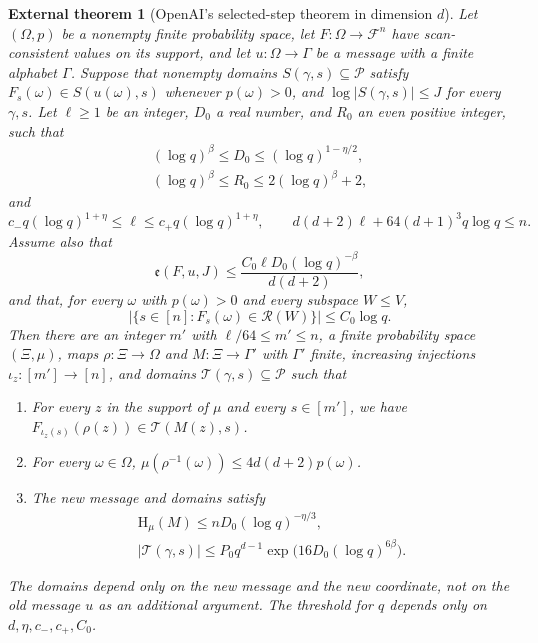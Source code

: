 \documentclass[11pt,a4paper]{article}
\numberwithin{equation}{section}
\newtheorem{external}[theorem]{External theorem}
\newcommand{\HH}{\mathrm H}
\begin{document}
\begin{external}[OpenAI's selected-step theorem in dimension $d$]
Let $(\Omega,p)$ be a nonempty finite probability space,
let $F:\Omega\to\mathcal F^n$ have scan-consistent values on
its support, and let $u:\Omega\to\Gamma$ be a message with a
finite alphabet $\Gamma$. Suppose that nonempty domains
$S(\gamma,s)\subseteq\mathcal P$ satisfy
$F_s(\omega)\in S(u(\omega),s)$ whenever $p(\omega)>0$,
and $\log|S(\gamma,s)|\le J$ for every $\gamma,s$.
Let $\ell\ge1$ be an integer, $D_0$ a real number, and $R_0$
an even positive integer, such that
\begin{equation}\label{eq:source-admissible}
 \begin{gathered}
 (\log q)^\beta\le D_0\le(\log q)^{1-\eta/2},\\
 (\log q)^\beta\le R_0\le2(\log q)^\beta+2,
 \end{gathered}
\end{equation}
and
\begin{equation}\label{eq:source-length}
 c_-q(\log q)^{1+\eta}\le\ell
 \le c_+q(\log q)^{1+\eta},\qquad
 d(d+2)\ell+64(d+1)^3q\log q\le n.
\end{equation}
Assume also that
\begin{equation}\label{eq:source-budget}
 \mathfrak e(F,u,J)
 \le\frac{C_0\ell D_0(\log q)^{-\beta}}{d(d+2)},
\end{equation}
and that, for every $\omega$ with $p(\omega)>0$ and every
subspace $W\le V$,
\begin{equation}\label{eq:source-occupancy}
 |\{s\in[n]:F_s(\omega)\in\mathcal R(W)\}|
 \le C_0\log q.
\end{equation}
Then there are an integer $m'$ with $\ell/64\le m'\le n$,
a finite probability space $(\Xi,\mu)$, maps
$\rho:\Xi\to\Omega$ and $M:\Xi\to\Gamma'$ with
$\Gamma'$ finite, increasing injections
$\iota_z:[m']\to[n]$, and domains
$\mathcal T(\gamma,s)\subseteq\mathcal P$ such that
\begin{enumerate}
\item[(i)] For every $z$ in the support of $\mu$ and every
$s\in[m']$, we have
$F_{\iota_z(s)}(\rho(z))\in \mathcal T(M(z),s)$.
\item[(ii)] For every $\omega\in\Omega$,
$\mu(\rho^{-1}(\omega))\le4d(d+2)p(\omega)$.
\item[(iii)] The new message and domains satisfy
\begin{equation}\label{eq:source-output}
 \begin{gathered}
 \HH_\mu(M)\le nD_0(\log q)^{-\eta/3},\\
 |\mathcal T(\gamma,s)|\le
 P_0q^{d-1}\exp\bigl(16D_0(\log q)^{6\beta}\bigr).
 \end{gathered}
\end{equation}
\end{enumerate}
The domains depend only on the new message and the new coordinate,
not on the old message $u$ as an additional argument.
The threshold for $q$ depends only on $d,\eta,c_-,c_+,C_0$.
\end{external}
\end{document}
